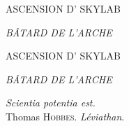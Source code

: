 \documentclass[a4paper,12pt,twoside,french]{book}
\begin{document}

  \thispagestyle{empty}
  \null\vfill           %

  \begin{center}
    {
      {
        \large
        \MakeUppercase{
          Ascension d’\elena{} skylab}
          \vspace{0.5em}
          
          \MakeUppercase{{\em{}bâtard de l’Arche}
        }
      }

    }
  \end{center}

  \vfill\null           %

  


  \cleardoublepage

  \thispagestyle{empty}
  \null\vfill           %

  \begin{center}
    {

      {
        \Huge
        \MakeUppercase{
          Ascension d’\elena{} skylab}
          \vspace{0.5em}
          
          \MakeUppercase{{\em{}bâtard de l’Arche}
        }
      }

      {
        \vspace{2em}
        \large
        \begin{flushright}
          {\em Scientia potentia est.}\\
%
          {\normalsize Thomas \textsc{Hobbes}. {\em Léviathan}.}
        \end{flushright}
      }
    }
  \end{center}
\end{document}
